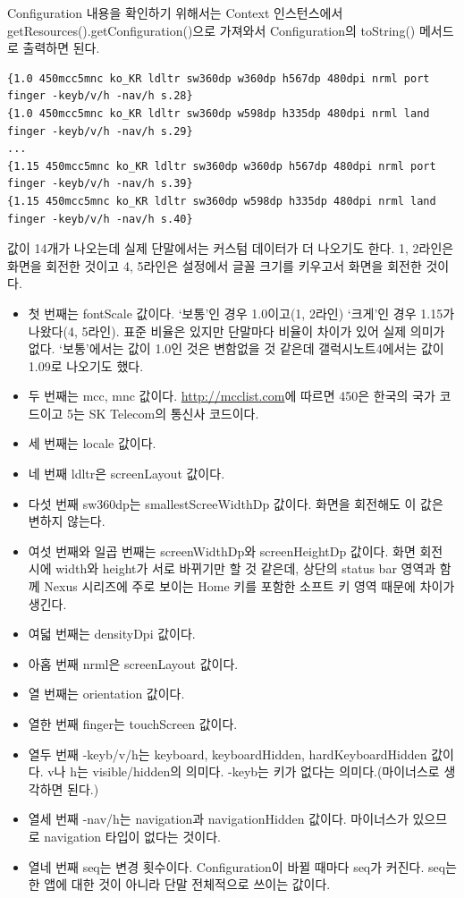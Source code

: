 Configuration 내용을 확인하기 위해서는 Context 인스턴스에서 getResources().getConfigura\-tion()으로 가져와서 Configuration의 toString() 메서드로 출력하면 된다. 
\begin{lstlisting}[frame=single]
{1.0 450mcc5mnc ko_KR ldltr sw360dp w360dp h567dp 480dpi nrml port finger -keyb/v/h -nav/h s.28}
{1.0 450mcc5mnc ko_KR ldltr sw360dp w598dp h335dp 480dpi nrml land finger -keyb/v/h -nav/h s.29}
...
{1.15 450mcc5mnc ko_KR ldltr sw360dp w360dp h567dp 480dpi nrml port finger -keyb/v/h -nav/h s.39}
{1.15 450mcc5mnc ko_KR ldltr sw360dp w598dp h335dp 480dpi nrml land finger -keyb/v/h -nav/h s.40}
\end{lstlisting}
값이 14개가 나오는데 실제 단말에서는 커스텀 데이터가 더 나오기도 한다. 1, 2라인은 화면을 회전한 것이고 4, 5라인은 설정에서 글꼴 크기를 키우고서 화면을 회전한 것이다.
\begin{itemize}
\item 첫 번째는 fontScale 값이다. `보통'인 경우 1.0이고(1, 2라인) `크게'인 경우 1.15가 나왔다(4, 5라인). 표준 비율은 있지만 단말마다 비율이 차이가 있어 실제 의미가 없다.  `보통'에서는 값이 1.0인 것은 변함없을 것 같은데 갤럭시노트4에서는 값이 1.09로 나오기도 했다.
\item 두 번째는 mcc, mnc 값이다. \url{http://mcclist.com}에 따르면 450은 한국의 국가 코드이고 5는 SK Telecom의 통신사 코드이다.
\item 세 번째는 locale 값이다.
\item 네 번째 ldltr은 screenLayout 값이다.
\item 다섯 번째 sw360dp는 smallestScreeWidthDp 값이다. 화면을 회전해도 이 값은 변하지 않는다.
\item 여섯 번째와 일곱 번째는 screenWidthDp와 screenHeightDp 값이다. 화면 회전 시에 width와 height가 서로 바뀌기만 할 것 같은데, 상단의 status bar 영역과 함께 Nexus 시리즈에 주로 보이는 Home 키를 포함한 소프트 키 영역 때문에 차이가 생긴다.
\item 여덟 번째는 densityDpi 값이다.
\item 아홉 번째 nrml은 screenLayout 값이다.
\item 열 번째는 orientation 값이다.
\item 열한 번째 finger는 touchScreen 값이다.
\item 열두 번째 -keyb/v/h는 keyboard, keyboardHidden, hardKeyboardHidden 값이다. v나 h는 visible/hidden의 의미다. -keyb는 키가 없다는 의미다.(마이너스로 생각하면 된다.)
\item 열세 번째 -nav/h는 navigation과 navigationHidden 값이다. 마이너스가  있으므로 navigation 타입이 없다는 것이다. 
\item 열네 번째 seq는 변경 횟수이다. Configuration이 바뀔 때마다 seq가 커진다. seq는 한 앱에 대한 것이 아니라 단말 전체적으로 쓰이는 값이다. 
\end{itemize}


